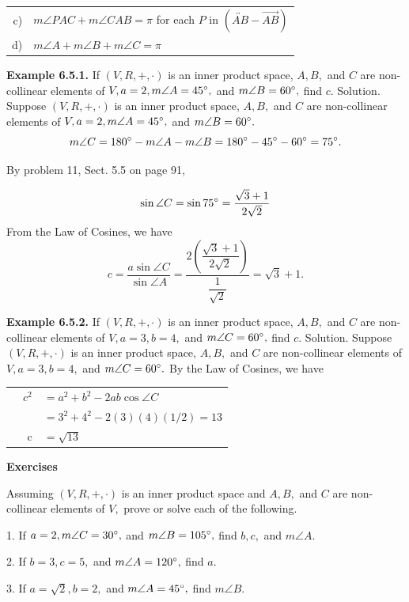 \begin{tabular}{r l}
c) &$m\angle PAC + m\angle CAB = \pi$ for each $P$ in $(\overleftrightarrow{AB} - \overrightarrow{AB})$\\
d) &$m\angle A + m\angle B + m\angle C  = \pi$\\
\end{tabular}\nl

\textbf{Example 6.5.1.} If $(V,R,+,\cdot)$ is an inner product space, $A, B,$ and $C$ are non-collinear elements of $V, a = 2, m\angle A = 45^{\circ},$ and $m\angle B =60^{\circ},$ find $c.$\nl
Solution. Suppose $(V,R,+,\cdot)$ is an inner product space, $A, B,$ and $C$ are non-collinear elements of $V, a = 2, m\angle A = 45^{\circ},$ and $m\angle B =60^{\circ}.$
\[m\angle C = 180^{\circ} - m\angle A - m\angle B = 180^{\circ} -45^{\circ} -60^{\circ} =75^{\circ}.\]

By problem 11, Sect. 5.5 on page 91,

\newpage
\[
\sin\angle C = \sin 75^{\circ} = \dfrac{\sqrt{3} + 1}{2\sqrt{2}}
\]
From the Law of Cosines, we have
\[
c = \dfrac{a\sin\angle C}{\sin\angle A} = \dfrac{2\left(\dfrac{\sqrt{3} + 1}{2\sqrt{2}}\right)}{\dfrac{1}{\sqrt{2}}} = \sqrt{3} + 1.
\]

\textbf{Example 6.5.2.} If $(V,R,+,\cdot)$ is an inner product space, $A, B,$ and $C$ are non-collinear
elements of $V, a=3, b=4,$ and $m\angle C =60^{\circ},$ find $c.$\nl
Solution. Suppose $(V,R,+,\cdot)$ is an inner product space, $A,B,$ and $C$ are non-collinear elements of $V, a = 3, b = 4,$ and $m\angle C =60^{\circ}.$ By the Law of Cosines, we have \nl

\begin{tabular}{r r l}
&$c^{2}$&$= a^{2} + b^{2} -2ab\cos\angle C$ \\
&&$=3^{2} + 4^{2} -2(3)(4)(1/2) = 13$ \\
&c&$= \sqrt{13}$ \\
\end{tabular}\nl

\textbf{Exercises}\nl

Assuming $(V,R,+,\cdot)$ is an inner product space and $A, B,$ and $C$ are non-collinear elements
of $V,$ prove or solve each of the following. \nl

1. If $a = 2, m\angle C = 30^{\circ},$ and $ m\angle B =105^{\circ},$ find $b, c,$ and $m\angle A.$\nl

2. If $b = 3, c = 5,$ and $m\angle A = 120^{\circ},$ find $a.$\nl

3. If $a =\sqrt{2}, b = 2,$ and $m\angle A = 45^{\circ},$ find $m\angle B.$ \nl

